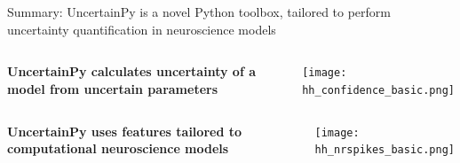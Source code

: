 \documentclass[presentation]{beamer}
\begin{document}
  \begin{frame}{Summary: UncertainPy is a novel Python toolbox, tailored to perform uncertainty quantification in neuroscience models}
\vspace{-10mm}
\begin{columns}

     \begin{center}
        \raggedright
      \bf{UncertainPy calculates uncertainty of a model from uncertain parameters}
     \end{center}
     \begin{center}
            \texttt{[image: hh\_confidence\_basic.png]}
     \end{center}

 \end{columns}

\vspace{5mm}

\begin{columns}
  \begin{center}
      \raggedright
   \bf{UncertainPy uses features tailored to computational neuroscience models}
  \end{center}
     \begin{center}
            \texttt{[image: hh\_nrspikes\_basic.png]}
     \end{center}

 \end{columns}

\pause
{}




\end{frame}
\end{document}
